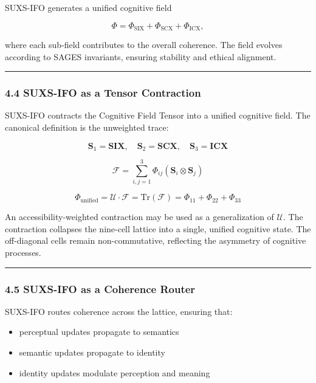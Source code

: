 SUXS-IFO generates a unified cognitive field

\[
\Phi = \Phi_{\text{SIX}} + \Phi_{\text{SCX}} + \Phi_{\text{ICX}},
\]

where each sub‑field contributes to the overall coherence. The field evolves according to SAGES invariants, ensuring stability and ethical alignment.

\begin{center}\rule{0.5\linewidth}{0.5pt}\end{center}

\subsubsection{4.4 SUXS-IFO as a Tensor Contraction}\label{suxs-ifo-as-a-tensor-contraction}

SUXS-IFO contracts the Cognitive Field Tensor into a unified cognitive field. The canonical definition is the unweighted trace:

\[
\mathbf{S}_1 = \mathbf{SIX},\quad \mathbf{S}_2 = \mathbf{SCX},\quad \mathbf{S}_3 = \mathbf{ICX}
\]

\[
\mathcal{F}=\sum_{i,j=1}^{3}\Phi_{ij}(\mathbf{S}_i\otimes\mathbf{S}_j)
\]

\[
\Phi_{\mathrm{unified}}=\mathcal{U}\cdot\mathcal{F}=\mathrm{Tr}(\mathcal{F})=\Phi_{11}+\Phi_{22}+\Phi_{33}
\]

An accessibility-weighted contraction may be used as a generalization of \(\mathcal{U}\). The contraction collapses the nine-cell lattice into a single, unified cognitive state. The off-diagonal cells remain non-commutative, reflecting the asymmetry of cognitive processes.

\begin{center}\rule{0.5\linewidth}{0.5pt}\end{center}

\subsubsection{4.5 SUXS-IFO as a Coherence Router}\label{suxs-ifo-as-a-coherence-router}

SUXS-IFO routes coherence across the lattice, ensuring that:

\begin{itemize}
\tightlist
\item
  perceptual updates propagate to semantics\\
\item
  semantic updates propagate to identity\\
\item
  identity updates modulate perception and meaning
\end{itemize}

